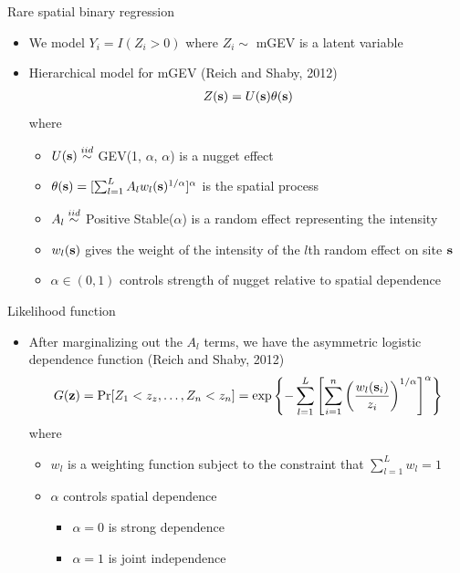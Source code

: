 \documentclass{beamer}
\begin{document}
\begin{frame}{Rare spatial binary regression}
  \begin{itemize} \setlength{\itemsep}{1em}
    \item We model $Y_i = I(Z_i > 0)$ where $Z_i\sim$ mGEV is a latent variable
    \item Hierarchical model for mGEV (Reich and Shaby, 2012)
    \begin{align*}
      Z(\mbox{\bf s}) = U(\mbox{\bf s}) \theta(\mbox{\bf s})
    \end{align*}
    where
    \begin{itemize} \setlength{\itemsep}{0.25em}
      \item $U(\mbox{\bf s}) \stackrel{iid}{\sim}$ GEV(1, $\alpha$, $\alpha$) is a nugget effect
      \item $\theta(\mbox{\bf s}) = [\sum_{l = 1}^L A_l w_l(\mbox{\bf s})^{1/\alpha}]^\alpha$ is the spatial process
      \item $A_l \stackrel{iid}{\sim}$ Positive Stable($\alpha$) is a random effect representing the intensity
      \item $w_l(\mbox{\bf s})$ gives the weight of the intensity of the $l$th random effect on site $\mbox{\bf s}$
      \item $\alpha \in (0, 1)$ controls strength of nugget relative to spatial dependence
    \end{itemize}
  \end{itemize}
\end{frame}

\begin{frame}{Likelihood function}
  \begin{itemize} \setlength{\itemsep}{1em}
    \item After marginalizing out the $A_l$ terms, we have the asymmetric logistic dependence function (Reich and Shaby, 2012)
    \footnotesize{
    \begin{align*}
      G(\mbox{\bf z}) = \Pr[Z_1 < z_z, \ldots, Z_n < z_n] = \exp\left\{ - \sum_{l = 1}^{L} \left[ \sum_{i = 1}^n \left( \frac{ w_l(\mbox{\bf s}_i) }{ z_i } \right)^{ 1 / \alpha} \right]^\alpha \right\}
    \end{align*}
    }
    where
    \begin{itemize} \setlength{\itemsep}{0.25em}
      \item $w_l$ is a weighting function subject to the constraint that $\sum_{l = 1}^L w_l = 1$
      \item $\alpha$ controls spatial dependence
      \begin{itemize}
        \item $\alpha = 0$ is strong dependence
        \item $\alpha = 1$ is joint independence
      \end{itemize}
    \end{itemize}
  \end{itemize}
\end{frame}
\end{document}
